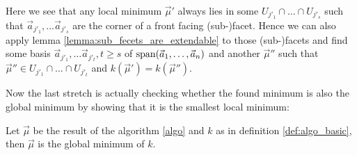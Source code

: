 \begin{observation}
    \label{obs:local_minima_in_front_facets}
    Here we see that any local minimum $\vec\mu'$ always lies in some $U_{j'_1} \cap \dots \cap U_{j'_s}$ such that $\vec a_{j'_1}, \dots \vec a_{j'_s}$ are the corner of a front facing (sub-)facet. Hence we can also apply lemma \ref{lemma:sub_fecets_are_extendable} to those (sub-)facets and find some basis $\vec a_{j'_1}, \dots \vec a_{j'_t}, t \geq s$ of $\operatorname{span}(\vec a_1, \dots, \vec a_n)$ and another $\vec\mu''$ such that $\vec\mu'' \in U_{j'_1} \cap \dots \cap U_{j'_t}$ and $k(\vec\mu') = k(\vec\mu'')$.
\end{observation}


Now the last stretch is actually checking whether the found minimum is also the global minimum by showing that it is the smallest local minimum:
\begin{theorem}
    Let $\vec\mu$ be the result of the algorithm \ref{algo} and $k$ as in definition \ref{def:algo_basic}, then $\vec\mu$ is the global minimum of $k$.
\end{theorem}
